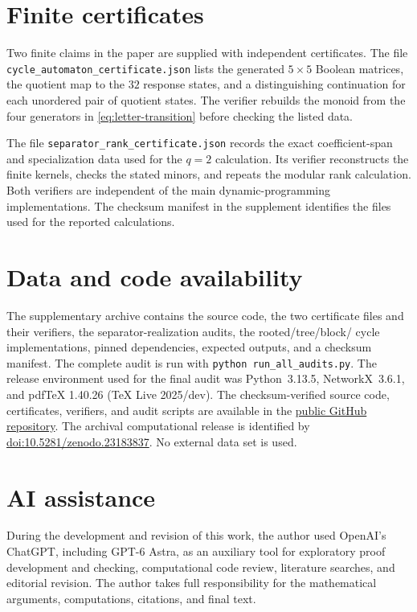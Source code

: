 \documentclass[11pt,reqno]{amsart}
\theoremstyle{definition}
\begin{document}
\appendix
\section{Finite certificates}\label{app:automaton-certificate}

Two finite claims in the paper are supplied with independent certificates.
The file \texttt{cycle\_automaton\_certificate.json} lists the generated
$5\times5$ Boolean matrices, the quotient map to the $32$ response states,
and a distinguishing continuation for each unordered pair of quotient states.
The verifier rebuilds the monoid from the four generators in
\eqref{eq:letter-transition} before checking the listed data.

The file \texttt{separator\_rank\_certificate.json} records the exact
coefficient-span and specialization data used for the $q=2$ calculation.  Its
verifier reconstructs the finite kernels, checks the stated minors, and
repeats the modular rank calculation.  Both verifiers are independent of the
main dynamic-programming implementations.  The checksum manifest in the
supplement identifies the files used for the reported calculations.

\section*{Data and code availability}

The supplementary archive contains the source code, the two certificate files
and their verifiers, the separator-realization audits, the rooted/tree/block/
cycle implementations, pinned dependencies, expected outputs, and a checksum
manifest.  The complete audit is run with
\texttt{python run\_all\_audits.py}.  The release environment used for the
final audit was Python~3.13.5, NetworkX~3.6.1, and pdf\TeX{} 1.40.26
(TeX Live 2025/dev).  The checksum-verified source code, certificates, verifiers, and audit scripts
are available in the
\href{https://github.com/gsidoine/zero-forcing-separator-algebras}{public GitHub repository}.
The archival computational release is identified by
\href{https://doi.org/10.5281/zenodo.23183837}{doi:10.5281/zenodo.23183837}.
No external data set is used.

\section*{AI assistance}

During the development and revision of this work, the author used OpenAI's
ChatGPT, including GPT-6 Astra, as an auxiliary tool for exploratory proof
development and checking, computational code review, literature searches, and
editorial revision.  The author takes full responsibility for the mathematical
arguments, computations, citations, and final text.
\end{document}
